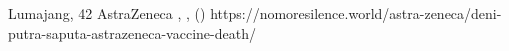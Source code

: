           {Lumajang, }
          {42}
          {AstraZeneca}
          {}
          {
            ,
            ,
             ()
          }
          {https://nomoresilence.world/astra-zeneca/deni-putra-saputa-astrazeneca-vaccine-death/}

          

